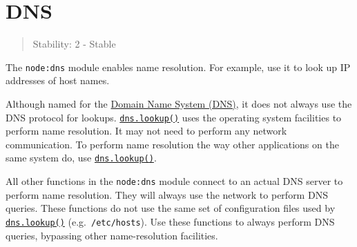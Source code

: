 \section{DNS}\label{dns}

\begin{quote}
Stability: 2 - Stable
\end{quote}

The \texttt{node:dns} module enables name resolution. For example, use
it to look up IP addresses of host names.

Although named for the
\href{https://en.wikipedia.org/wiki/Domain_Name_System}{Domain Name
System (DNS)}, it does not always use the DNS protocol for lookups.
\hyperref[dnslookuphostname-options-callback]{\texttt{dns.lookup()}}
uses the operating system facilities to perform name resolution. It may
not need to perform any network communication. To perform name
resolution the way other applications on the same system do, use
\hyperref[dnslookuphostname-options-callback]{\texttt{dns.lookup()}}.

\begin{Shaded}
\begin{Highlighting}[]
\OperatorTok{=} \NormalTok{(}\NormalTok{)}\OperatorTok{;}

\NormalTok{(}\OperatorTok{,}\OperatorTok{,}\OperatorTok{,}\KeywordTok{=\textgreater{}}\NormalTok{ \{}
  \NormalTok{(}\OperatorTok{,}\OperatorTok{,}\OperatorTok{;}
\NormalTok{\})}\OperatorTok{;}
\end{Highlighting}
\end{Shaded}

All other functions in the \texttt{node:dns} module connect to an actual
DNS server to perform name resolution. They will always use the network
to perform DNS queries. These functions do not use the same set of
configuration files used by
\hyperref[dnslookuphostname-options-callback]{\texttt{dns.lookup()}}
(e.g.~\texttt{/etc/hosts}). Use these functions to always perform DNS
queries, bypassing other name-resolution facilities.

